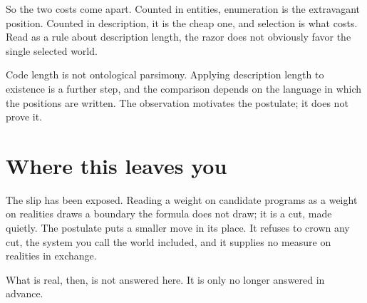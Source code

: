 So the two costs come apart. Counted in entities, enumeration is the extravagant position. Counted in description, it is the cheap one, and selection is what costs. Read as a rule about description length, the razor does not obviously favor the single selected world.

Code length is not ontological parsimony. Applying description length to existence is a further step, and the comparison depends on the language in which the positions are written. The observation motivates the postulate; it does not prove it.

\section*{Where this leaves you}

The slip has been exposed. Reading a weight on candidate programs as a weight on realities draws a boundary the formula does not draw; it is a cut, made quietly. The postulate puts a smaller move in its place. It refuses to crown any cut, the system you call the world included, and it supplies no measure on realities in exchange.

What is real, then, is not answered here. It is only no longer answered in advance.
